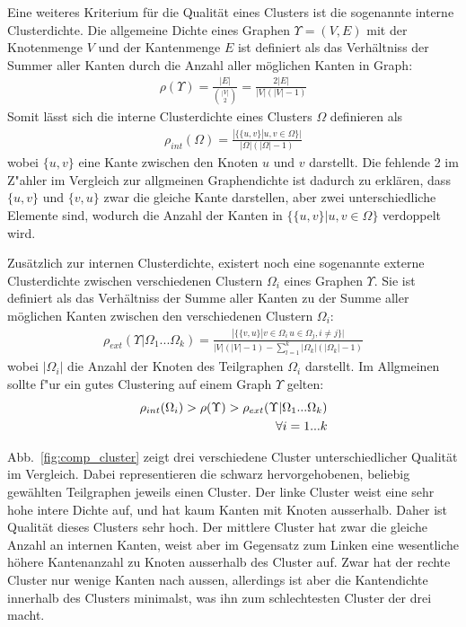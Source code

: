 \documentclass[journal]{vgtc}
\begin{document}
  Eine weiteres Kriterium für die Qualität eines Clusters ist die sogenannte interne Clusterdichte.
  Die allgemeine Dichte eines Graphen $\Upsilon = (V,E)$ mit der Knotenmenge $V$ und der Kantenmenge
  $E$ ist definiert als das Verhältniss der Summer aller Kanten durch die Anzahl aller 
  möglichen Kanten in Graph:
    \begin{align}
      \rho(\Upsilon) = \frac{|E|}{\binom{|V|}{2}} = \frac{2|E|}{|V|(|V|-1)}
    \end{align}
  Somit lässt sich die interne Clusterdichte eines Clusters $\Omega$ definieren als
    \begin{align}
      \rho_{int}(\Omega) = \frac{|\{\{u,v\} |u,v \in \Omega \}|}{|\Omega|(|\Omega|-1)}
    \end{align}
  wobei $\{u,v\}$ eine Kante zwischen den Knoten $u$ und $v$ darstellt. Die fehlende 2 im Z"ahler
  im Vergleich zur allgmeinen Graphendichte ist dadurch zu erklären, dass $\{u,v\}$ und $\{v,u\}$ 
  zwar die gleiche Kante darstellen, aber zwei unterschiedliche Elemente sind, wodurch die Anzahl
  der Kanten in $\{\{u,v\} |u,v \in \Omega \}$ verdoppelt wird.
  
  Zusätzlich zur internen Clusterdichte, existert noch eine sogenannte externe Clusterdichte 
  zwischen verschiedenen Clustern $\Omega_i$ eines Graphen $\Upsilon$. Sie ist definiert als
  das Verhältniss der Summe aller Kanten zu der Summe aller möglichen Kanten zwischen den
  verschiedenen Clustern $\Omega_i$:
    \begin{align}
      \rho_{ext}(\Upsilon|\Omega_1 ... \Omega_k) = \frac{|\{\{v,u\} | v\in \Omega_i\, u \in \Omega_j, i \neq j\}|}
                                                        {|V|(|V|-1)-\sum\limits_{l=1}^k |\Omega_k|(|\Omega_k|-1)}
    \end{align}
  wobei $|\Omega_i|$ die Anzahl der Knoten des Teilgraphen $\Omega_i$ darstellt.
  Im Allgmeinen sollte f"ur ein gutes Clustering auf einem Graph $\Upsilon$ gelten:
    \begin{align}
      \rho_{int}(\Omega_i) > \rho(\Upsilon) > \rho_{ext}(\Upsilon|\Omega_1 ... \Omega_k) \\ 
      			\forall i=1...k \notag
    \end{align}
  
  Abb.~\ref{fig:comp_cluster} zeigt drei verschiedene Cluster unterschiedlicher Qualität im Vergleich.
  Dabei representieren die schwarz hervorgehobenen, beliebig gewählten Teilgraphen jeweils 
  einen Cluster. Der linke Cluster weist eine sehr hohe intere
  Dichte auf, und hat kaum Kanten mit Knoten ausserhalb. Daher ist Qualität dieses Clusters
  sehr hoch. Der mittlere Cluster hat zwar die gleiche Anzahl an internen Kanten, weist
  aber im Gegensatz zum Linken eine wesentliche höhere Kantenanzahl zu Knoten ausserhalb des
  Cluster auf. Zwar hat der rechte Cluster nur wenige Kanten nach aussen, allerdings ist aber
  die Kantendichte innerhalb des Clusters minimalst, was ihn zum schlechtesten Cluster der drei macht.
\end{document}
